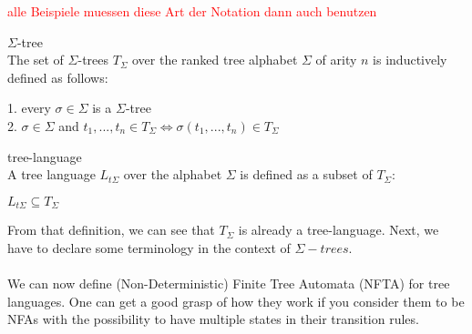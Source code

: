 \documentclass{llncs}
\begin{document}
\textcolor{red}{alle Beispiele muessen diese Art der Notation dann auch benutzen}

\begin{definition}{\(\Sigma\)-tree \cite{automata-xml}}
	\\
	The set of \(\Sigma\)-trees \(T_\Sigma\) over the ranked tree alphabet \(\Sigma\) of arity \(n\) is inductively defined as follows:
	\begin{center}
		1. every \(\sigma \in \Sigma\) is a \(\Sigma\)-tree\\
		2. \(\sigma \in \Sigma\) and \(t_1,...,t_n \in T_\Sigma \iff \sigma(t_1,...,t_n) \in T_\Sigma\) 
	\end{center}
\end{definition}

\pagebreak

\begin{definition}{tree-language \cite{automata-xml}}
	\\
	A tree language \(L_{t\Sigma}\) over the alphabet \(\Sigma\) is defined as a subset of \(T_\Sigma\):
	\begin{center}
		\(L_{t\Sigma} \subseteq T_\Sigma\)
	\end{center}	
\end{definition}

From that definition, we can see that \(T_\Sigma\) is already a tree-language.
Next, we have to declare some terminology in the context of $\Sigma-trees$.
\\
\\
We can now define (Non-Deterministic) Finite Tree Automata (NFTA) for tree languages. One can get a good grasp of how they work if you consider them to be NFAs with the possibility to have multiple states in their transition rules.
\end{document}
